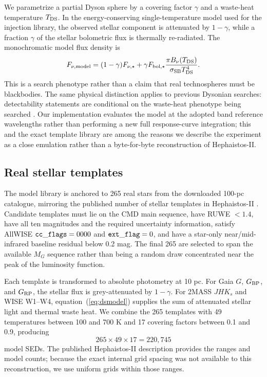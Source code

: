 \documentclass[fleqn,usenatbib]{mnras}
\begin{document}
We parametrize a partial Dyson sphere by a covering factor $\gamma$ and a waste-heat temperature $T_{\rm DS}$. In the energy-conserving single-temperature model used for the injection library, the observed stellar component is attenuated by $1-\gamma$, while a fraction $\gamma$ of the stellar bolometric flux is thermally re-radiated. The monochromatic model flux density is
\begin{equation}
F_{\nu,{\rm model}}=(1-\gamma)F_{\nu,\star}
+\gamma F_{{\rm bol},\star}
\frac{\pi B_\nu(T_{\rm DS})}{\sigma_{\rm SB}T_{\rm DS}^4}.
\label{eq:dsmodel}
\end{equation}
This is a search phenotype rather than a claim that real technospheres must be blackbodies. The same physical distinction applies to previous Dysonian searches: detectability statements are conditional on the waste-heat phenotype being searched \citep{Wright2014b,Suazo2022}. Our implementation evaluates the model at the adopted band reference wavelengths rather than performing a new full response-curve integration; this and the exact template library are among the reasons we describe the experiment as a close emulation rather than a byte-for-byte reconstruction of Hephaistos-II.

\subsection{Real stellar templates}

The model library is anchored to 265 real stars from the downloaded 100-pc catalogue, mirroring the published number of stellar templates in Hephaistos-II \citep{Suazo2024}. Candidate templates must lie on the CMD main sequence, have RUWE $<1.4$, have all ten magnitudes and the required uncertainty information, satisfy AllWISE ${\tt cc\_flags}=0000$ and ${\tt ext\_flag}=0$, and have a star-only near/mid-infrared baseline residual below 0.2 mag. The final 265 are selected to span the available $M_G$ sequence rather than being a random draw concentrated near the peak of the luminosity function.

Each template is transformed to absolute photometry at 10 pc. For Gaia $G$, $G_{\rm BP}$, and $G_{\rm RP}$, the stellar flux is grey-attenuated by $1-\gamma$. For 2MASS $JHK_s$ and WISE W1--W4, equation~(\ref{eq:dsmodel}) supplies the sum of attenuated stellar light and thermal waste heat. We combine the 265 templates with 49 temperatures between 100 and 700 K and 17 covering factors between 0.1 and 0.9, producing
\begin{equation}
265\times49\times17=220,745
\end{equation}
model SEDs. The published Hephaistos-II description provides the ranges and model counts; because the exact internal grid spacing was not available to this reconstruction, we use uniform grids within those ranges.
\end{document}

